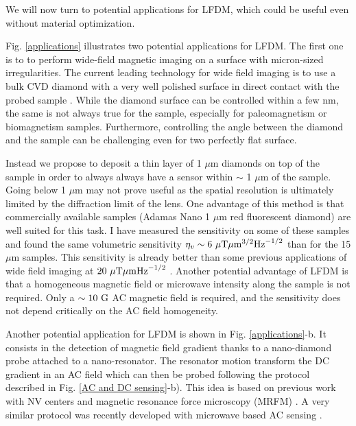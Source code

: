 \documentclass[a4paper,11pt]{report}
\begin{document}
We will now turn to potential applications for LFDM, which could be useful even without material optimization.

Fig. \ref{applications} illustrates two potential applications for LFDM. The first one is to to perform wide-field magnetic imaging on a surface with micron-sized irregularities. The current leading technology for wide field imaging is to use a bulk CVD diamond with a very well polished surface in direct contact with the probed sample \citep{levine2019principles, scholten2021widefield}. While the diamond surface can be controlled within a few nm, the same is not always true for the sample, especially for paleomagnetism or biomagnetism samples. Furthermore, controlling the angle between the diamond and the sample can be challenging even for two perfectly flat surface. 

Instead we propose to deposit a thin layer of 1 $\mu$m diamonds on top of the sample in order to always always have a sensor within $\sim$ 1 $\mu$m of the sample. Going below 1 $\mu$m may not prove useful as the spatial resolution is ultimately limited by the diffraction limit of the lens. One advantage of this method is that commercially available samples (Adamas Nano 1 $\mu$m red fluorescent diamond) are well suited for this task. I have measured the sensitivity on some of these samples and found the same volumetric sensitivity $\eta_v \sim 6 \ \rm{\mu T}\mu \rm{m}^{3/2} \rm{Hz}^{-1/2}$ than for the 15 $\mu$m samples. This sensitivity is already better than some previous applications of wide field imaging at $20  \ \rm{\mu T}\mu \rm{m} \rm{Hz}^{-1/2}$ \citep{glenn2017micrometer}. Another potential advantage of LFDM is that a homogeneous magnetic field or microwave intensity along the sample is not required. Only a $\sim 10 \ \rm G$ AC magnetic field is required, and the sensitivity does not depend critically on the AC field homogeneity.

Another potential application for LFDM is shown in Fig. \ref{applications}-b. It consists in the detection of magnetic field gradient thanks to a nano-diamond probe attached to a nano-resonator. The resonator motion transform the DC gradient in an AC field which can then be probed following the protocol described in Fig. \ref{AC and DC sensing}-b). This idea is based on previous work with NV centers \citep{arcizet2011single} and magnetic resonance force microscopy (MRFM) \citep{rugar2004single}. A very similar protocol was recently developed with microwave based AC sensing \citep{huxter2022scanning}. 
\end{document}
